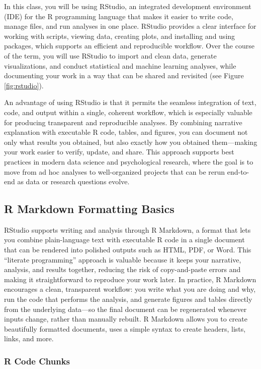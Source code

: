 \documentclass[
  11pt,
]{article}
\begin{document}
In this class, you will be using RStudio, an integrated development
environment (IDE) for the R programming language that makes it easier to
write code, manage files, and run analyses in one place. RStudio
provides a clear interface for working with scripts, viewing data,
creating plots, and installing and using packages, which supports an
efficient and reproducible workflow. Over the course of the term, you
will use RStudio to import and clean data, generate visualizations, and
conduct statistical and machine learning analyses, while documenting
your work in a way that can be shared and revisited (see Figure
\ref{fig:rstudio}).

An advantage of using RStudio is that it permits the seamless
integration of text, code, and output within a single, coherent
workflow, which is especially valuable for producing transparent and
reproducible analyses. By combining narrative explanation with
executable R code, tables, and figures, you can document not only what
results you obtained, but also exactly how you obtained them---making
your work easier to verify, update, and share. This approach supports
best practices in modern data science and psychological research, where
the goal is to move from ad hoc analyses to well-organized projects that
can be rerun end-to-end as data or research questions evolve.

\subsection{R Markdown Formatting
Basics}\label{r-markdown-formatting-basics}

RStudio supports writing and analysis through R Markdown, a format that
lets you combine plain-language text with executable R code in a single
document that can be rendered into polished outputs such as HTML, PDF,
or Word. This ``literate programming'' approach is valuable because it
keeps your narrative, analysis, and results together, reducing the risk
of copy-and-paste errors and making it straightforward to reproduce your
work later. In practice, R Markdown encourages a clean, transparent
workflow: you write what you are doing and why, run the code that
performs the analysis, and generate figures and tables directly from the
underlying data---so the final document can be regenerated whenever
inputs change, rather than manually rebuilt. R Markdown allows you to
create beautifully formatted documents, uses a simple syntax to create
headers, lists, links, and more.

\subsubsection{R Code Chunks}\label{r-code-chunks}
\end{document}

